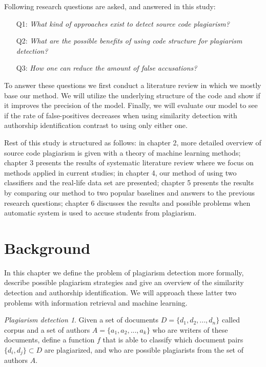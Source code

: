 \documentclass[english, grading]{tktltiki2}
\theoremstyle{definition}
\theoremstyle{remark}
\numberwithin{equation}{section} %
\begin{document}
Following research questions are asked, and answered in this study:

\begin{itemize}
    \item[Q1:] \emph{What kind of approaches exist to detect source code plagiarism?}
    \item[Q2:] \emph{What are the possible benefits of using code structure for plagiarism detection?}
    \item[Q3:] \emph{How one can reduce the amount of false accusations?}
\end{itemize}

\noindent
To answer these questions we first conduct a literature review in which we mostly base our method. We will utilize the underlying structure of the code and show if it improves the precision of the model. Finally, we will evaluate our model to see if the rate of false-positives decreases when using similarity detection with authorship identification contrast to using only either one.

Rest of this study is structured as follows: in chapter 2, more detailed overview of source code plagiarism is given with a theory of machine learning methods; chapter 3 presents the results of systematic literature review where we focus on methods applied in current studies; in chapter 4, our method of using two classifiers and the real-life data set are presented; chapter 5 presents the results by comparing our method to two popular baselines and answers to the previous research questions; chapter 6 discusses the results and possible problems when automatic system is used to accuse students from plagiarism. 

\section{Background}

In this chapter we define the problem of plagiarism detection more formally, describe possible plagiarism strategies and give an overview of the similarity detection and authorship identification. We will approach these latter two problems with information retrieval and machine learning. 

\newtheorem*{sc-plg}{Plagiarism detection}
\begin{sc-plg}
Given a set of documents $D = \{d_1, d_2, ..., d_n\}$ called corpus and a set of authors $A = \{a_1, a_2, ..., a_k\}$ who are writers of these documents, define a function $f$ that is able to classify which document pairs $\{d_i, d_j\} \subset D$ are plagiarized, and who are possible plagiarists from the set of authors $A$.
\end{sc-plg}
\end{document}
